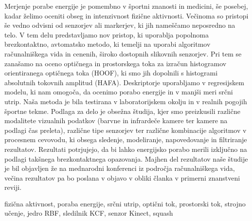 \povzetekp
Merjenje porabe energije je pomembno v športni znanosti in medicini, še posebej, kadar želimo oceniti obseg in intenzivnost fizične aktivnosti. Večinoma so pristopi še vedno odvisni od senzorjev ali markerjev, ki jih nameščamo neposredno na telo. V tem delu predstavljamo nov pristop, ki uporablja popolnoma brezkontaktno, avtomatsko metodo, ki temelji na uporabi algoritmov računalniškega vida in cenenih, široko dostopnih slikovnih senzorjev. Pri tem se zanašamo na oceno optičnega in prostorskega toka za izračun histogramov orientiranega optičnega toka (HOOF), ki smo jih dopolnili s histogrami absolutnih tokovnih amplitud (HAFA). Deskriptorje uporabljamo v regresijskem modelu, ki nam omogoča, da ocenimo porabo energije in v manjši meri srčni utrip. Naša metoda je bila testirana v laboratorijskem okolju in v realnih pogojih športne tekme. Podlaga za delo je obsežna študija, kjer smo preizkusili različne modalitete vizualnih podatkov (barvne in infrardeče kamere ter kamere na podlagi čas preleta), različne tipe senzorjev ter različne kombinacije algoritmov v procesnem cevovodu, ki obsega sledenje, modeliranje, napovedovanje in filtriranje rezultatov. Rezultati potrjujejo, da bi lahko energijsko porabo merili izključno na podlagi takšnega brezkontaktnega opazovanja. Majhen del rezultatov naše študije je bil objavljen že na mednarodni konferenci iz področja računalniškega vida, večina rezultatov pa bo poslana v objavo v obliki članka v primerni znanstveni reviji.

\kljucnebesede fizična aktivnost, poraba energije, srčni utrip, optični tok, prostorski tok, strojno učenje, jedro RBF, sledilnik KCF, senzor Kinect, squash